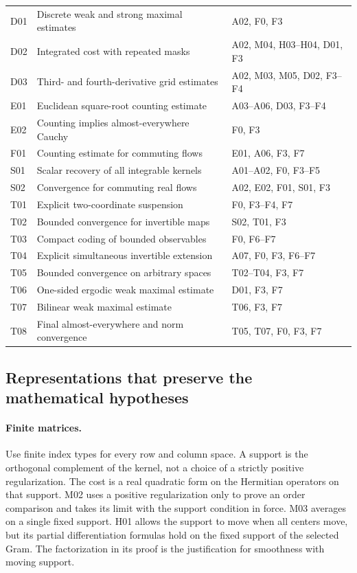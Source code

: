 \documentclass[11pt]{article}
\theoremstyle{remark}\newtheorem{remark}[theorem]{Remark}
\begin{document}
\begin{longtable}{@{}p{0.47in}p{2.86in}p{2.78in}@{}}
D01 & Discrete weak and strong maximal estimates & A02, F0, F3\\
D02 & Integrated cost with repeated masks & A02, M04, H03--H04, D01, F3\\
D03 & Third- and fourth-derivative grid estimates & A02, M03, M05, D02, F3--F4\\
E01 & Euclidean square-root counting estimate & A03--A06, D03, F3--F4\\
E02 & Counting implies almost-everywhere Cauchy & F0, F3\\
F01 & Counting estimate for commuting flows & E01, A06, F3, F7\\
S01 & Scalar recovery of all integrable kernels & A01--A02, F0, F3--F5\\
S02 & Convergence for commuting real flows & A02, E02, F01, S01, F3\\
T01 & Explicit two-coordinate suspension & F0, F3--F4, F7\\
T02 & Bounded convergence for invertible maps & S02, T01, F3\\
T03 & Compact coding of bounded observables & F0, F6--F7\\
T04 & Explicit simultaneous invertible extension & A07, F0, F3, F6--F7\\
T05 & Bounded convergence on arbitrary spaces & T02--T04, F3, F7\\
T06 & One-sided ergodic weak maximal estimate & D01, F3, F7\\
T07 & Bilinear weak maximal estimate & T06, F3, F7\\
T08 & Final almost-everywhere and norm convergence & T05, T07, F0, F3, F7\\
\end{longtable}
\endgroup

\subsection{Representations that preserve the mathematical hypotheses}
\paragraph{Finite matrices.}
Use finite index types for every row and column space. A support is the orthogonal complement of the kernel, not a choice of a strictly positive regularization. The cost is a real quadratic form on the Hermitian operators on that support. M02 uses a positive regularization only to prove an order comparison and takes its limit with the support condition in force. M03 averages on a single fixed support. H01 allows the support to move when all centers move, but its partial differentiation formulas hold on the fixed support of the selected Gram. The factorization in its proof is the justification for smoothness with moving support.
\end{document}
